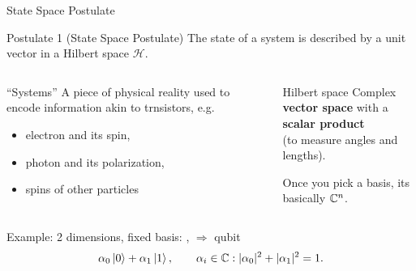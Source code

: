 \documentclass[
handout,
ignorenonframetext,hyperref={pdftex,unicode},xcolor=dvipsnames]{beamer}
\begin{document}
\begin{frame}{State Space Postulate}
\pause
  \begin{block}{Postulate 1 (State Space Postulate)}
  The state of a system is described by a unit vector in a Hilbert space $\mathcal H$.
  \end{block}

  \pause

  \begin{columns}
  \column{5.4cm}

    \begin{block}{``Systems''}
      A piece of physical reality used to encode information akin to trnsistors, e.g.
      \begin{itemize}
      \item electron and its spin,
      \item photon and its polarization,
      \item spins of other particles
      \end{itemize}

    \end{block}

  \column{5.4cm} \pause  
  
    \begin{block}{Hilbert space}
      Complex \textbf{vector space} with a\\\textbf{scalar product}
      \\
      (to measure angles and lengths).
      
      \pause
      \vspace{7mm}
      Once you pick a basis, its basically $\mathbb C^n$.
    \end{block}
  
  \end{columns}


  \pause
  \begin{block}{Example: 2 dimensions, fixed basis: \ko, \ki $\Rightarrow$ \alert{qubit}}
  \[
    \alpha_0 \ket 0 + \alpha_1 \ket 1, \qquad 
    \alpha_i \in \mathbb C: |\alpha_0|^2 + |\alpha_1|^2 = 1.
  \]
  \end{block}

\end{frame}

\end{document}
